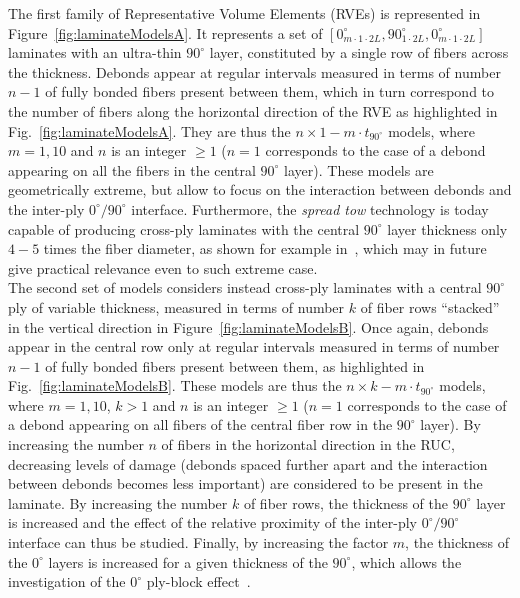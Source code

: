 \documentclass[review]{elsarticle}
\begin{document}
The first family of Representative Volume Elements (RVEs) is represented in Figure~\ref{fig:laminateModelsA}. It represents a set of $\left[0_{m\cdot 1\cdot2L}^{\circ},90_{1\cdot2L}^{\circ},0_{m\cdot 1\cdot2L}^{\circ}\right]$ laminates with an ultra-thin $90^{\circ}$ layer, constituted by a single row of fibers across the thickness. Debonds appear at regular intervals measured in terms of number $n-1$ of fully bonded fibers present between them, which in turn correspond to the number of fibers along the horizontal direction of the RVE as highlighted in Fig.~\ref{fig:laminateModelsA}. They are thus the $n\times1-m\cdot t_{90^{\circ}}$ models, where $m=1,10$ and $n$ is an integer $\geq1$ ($n=1$ corresponds to the case of a debond appearing on all the fibers in the central $90^{\circ}$ layer). These models are geometrically extreme, but allow to focus on the interaction between debonds and the inter-ply $0^{\circ}/90^{\circ}$ interface. Furthermore, the \emph{spread tow} technology is today capable of producing cross-ply laminates with the central $90^{\circ}$ layer thickness only $4-5$ times the fiber diameter, as shown for example in~\cite{Saito2012}, which may in future give practical relevance even to such extreme case.\\
The second set of models considers instead cross-ply laminates with a central $90^{\circ}$ ply of variable thickness, measured in terms of number $k$ of fiber rows ``stacked'' in the vertical direction in Figure~\ref{fig:laminateModelsB}. Once again, debonds appear in the central row only at regular intervals measured in terms of number $n-1$ of fully bonded fibers present between them, as highlighted in Fig.~\ref{fig:laminateModelsB}. These models are thus the $n\times k-m\cdot t_{90^{\circ}}$ models, where $m=1,10$, $k>1$ and $n$ is an integer $\geq1$ ($n=1$ corresponds to the case of a debond appearing on all fibers of the central fiber row in the $90^{\circ}$ layer). By increasing the number $n$ of fibers in the horizontal direction in the RUC, decreasing levels of damage (debonds spaced further apart and the interaction between debonds becomes less important) are considered to be present in the laminate. By increasing the number $k$ of fiber rows, the thickness of the $90^{\circ}$ layer is increased and the effect of the relative proximity of the inter-ply $0^{\circ}/90^{\circ}$ interface can thus be studied. Finally, by increasing the factor $m$, the thickness of the $0^{\circ}$ layers is increased for a given thickness of the $90^{\circ}$, which allows the investigation of the $0^{\circ}$ ply-block effect~\cite{Teixeira2016}.
\end{document}
